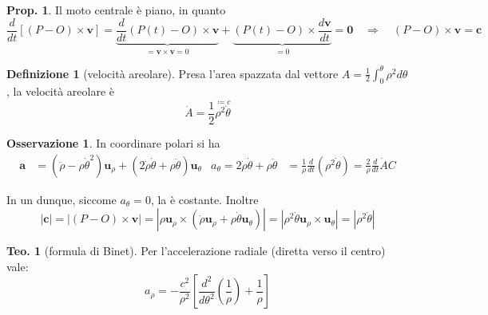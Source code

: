 \documentclass[a4paper,10pt]{article}
\theoremstyle{definition}
\newcommand{\bv}{\boldsymbol} %
\theoremstyle{indentdefinition}
\newtheorem{defn}{Definizione}[section]
\theoremstyle{indenttheorem}
\newtheorem{thm}{Teo.}
\newtheorem{prop}{Prop.}
\theoremstyle{myremark}
\newtheorem*{rem*}{Osservazione}
\theoremstyle{indentgeneral}
\begin{document}
\begin{prop}
Il moto centrale è piano, in quanto 
\[
\frac{d}{dt}\left[\left(P-O\right)\times\boldsymbol{v}\right]=\underbrace{\frac{d}{dt}(P(t)-O)\times\bv{v}}_{=\bv{v}\times\bv{v}=0}+\underbrace{\left(P(t)-O\right)\times\frac{d\boldsymbol{v}}{dt}}_{=0}=\boldsymbol{0}\quad\Longrightarrow\quad\left(P-O\right)\times\boldsymbol{v}=\boldsymbol{c}
\]
\end{prop}
\begin{defn}[velocità areolare]
\label{def:velocita-areolare}Presa l'area spazzata dal vettore $A=\frac{1}{2}\int_{0}^{\theta}\rho^{2}d\theta$,
la velocità areolare è 
\[
\dot{A}=\frac{1}{2}\overset{\coloneqq c}{\boxed{\rho^{2}\dot{\theta}}}
\]
\end{defn}

\begin{rem*}
In coordinare polari si ha
\begin{align*}
\boldsymbol{a} & =\left(\ddot{\rho}-\rho\dot{\theta}^{2}\right)\boldsymbol{u}_{\rho}+\boxed{\left(2\dot{\rho}\dot{\theta}+\rho\ddot{\theta}\right)}\boldsymbol{u}_{\theta} & a_{\theta}=2\dot{\rho}\dot{\theta}+\rho\ddot{\theta} & =\frac{1}{\rho}\frac{d}{dt}\left(\rho^{2}\dot{\theta}\right)=\frac{2}{\rho}\frac{d}{dt}\dot{A}
C\end{align*}

In un  dunque, siccome $a_{\theta}=0$,
la  è costante. Inoltre
\[
\left|\boldsymbol{c}\right|=\left|\left(P-O\right)\times\boldsymbol{v}\right|=\left|\rho\boldsymbol{u}_{\rho}\times\left(\dot{\rho}\boldsymbol{u}_{\rho}+\rho\dot{\theta}\boldsymbol{u}_{\theta}\right)\right|=\left|\rho^{2}\dot{\theta}\boldsymbol{u}_{\rho}\times\boldsymbol{u}_{\theta}\right|=\left|\rho^{2}\dot{\theta}\right|
\]
\end{rem*}
\begin{thm}[formula di Binet] Per l'accelerazione radiale (diretta verso il centro) vale:
\label{thm:formula-Binet}
\[
a_{\rho}=-\frac{c^{2}}{\rho^{2}}\left[\frac{d^{2}}{d\theta^{2}}\left(\frac{1}{\rho}\right)+\frac{1}{\rho}\right]
\]
\end{thm}
\end{document}
